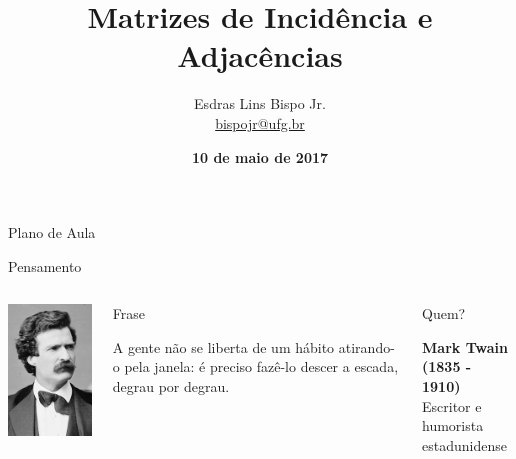 \documentclass[xcolor=dvipsnames,table]{beamer}
\title{Matrizes de Incidência e Adjacências}
\author{
  Esdras Lins Bispo Jr. \\ \url{bispojr@ufg.br}
  }
\institute{
  Teoria de Grafos \\Bacharelado em Ciência da Computação}
\date{\textbf{10 de maio de 2017} }
\begin{document}
	\begin{frame}
		\titlepage
	\end{frame}

	\AtBeginSection{
		\begin{frame}{Sumário}%
    		\tableofcontents[currentsection]
		\end{frame}
	}

	\begin{frame}{Plano de Aula}
		\tableofcontents
	\end{frame}
    
    \begin{frame}{Pensamento}
		\begin{columns}
		  		\begin{center}
		    		\includegraphics[height=.8\textheight]{images/mark.jpg}
		  		\end{center}
				\begin{block}{Frase}
					\begin{center}
						{\large A gente não se liberta de um hábito atirando-o pela janela: é preciso fazê-lo descer a escada, degrau por degrau.}
					\end{center}
				\end{block}		  		
		  		\begin{block}{Quem?}
		  			\begin{center}
						{\bf Mark Twain (1835 - 1910)} \\Escritor e humorista estadunidense
					\end{center}
				\end{block}
		\end{columns}
	\end{frame}
    
\end{document}
